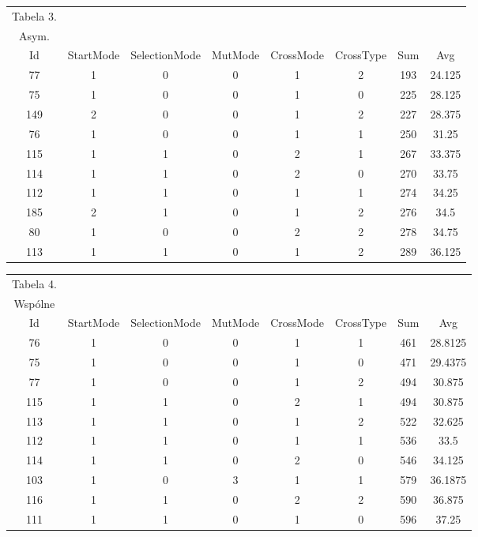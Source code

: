 \documentclass{article}
\begin{document}
\begin{table}[h!]
	\centering
	\begin{tabular}{c||c|c|c|c|c||c|c}
Tabela 3.\\
Asym.\\
Id & StartMode & SelectionMode & MutMode & CrossMode & CrossType & Sum & Avg \\
\hline
77 & 1 & 0 & 0 & 1 & 2 & 193 & 24.125 \\
75 & 1 & 0 & 0 & 1 & 0 & 225 & 28.125 \\
149 & 2 & 0 & 0 & 1 & 2 & 227 & 28.375 \\
76 & 1 & 0 & 0 & 1 & 1 & 250 & 31.25 \\
115 & 1 & 1 & 0 & 2 & 1 & 267 & 33.375 \\
114 & 1 & 1 & 0 & 2 & 0 & 270 & 33.75 \\
112 & 1 & 1 & 0 & 1 & 1 & 274 & 34.25 \\
185 & 2 & 1 & 0 & 1 & 2 & 276 & 34.5 \\
80 & 1 & 0 & 0 & 2 & 2 & 278 & 34.75 \\
113 & 1 & 1 & 0 & 1 & 2 & 289 & 36.125 \\
	\end{tabular}
\end{table}

\begin{table}[h!]
	\centering
	\begin{tabular}{c||c|c|c|c|c||c|c}
Tabela 4.\\
Wspólne\\
Id & StartMode & SelectionMode & MutMode & CrossMode & CrossType & Sum & Avg \\
\hline
76 & 1 & 0 & 0 & 1 & 1 & 461 & 28.8125 \\
75 & 1 & 0 & 0 & 1 & 0 & 471 & 29.4375 \\
77 & 1 & 0 & 0 & 1 & 2 & 494 & 30.875 \\
115 & 1 & 1 & 0 & 2 & 1 & 494 & 30.875 \\
113 & 1 & 1 & 0 & 1 & 2 & 522 & 32.625 \\
112 & 1 & 1 & 0 & 1 & 1 & 536 & 33.5 \\
114 & 1 & 1 & 0 & 2 & 0 & 546 & 34.125 \\
103 & 1 & 0 & 3 & 1 & 1 & 579 & 36.1875 \\
116 & 1 & 1 & 0 & 2 & 2 & 590 & 36.875 \\
111 & 1 & 1 & 0 & 1 & 0 & 596 & 37.25 \\
	\end{tabular}
\end{table}
\end{document}
